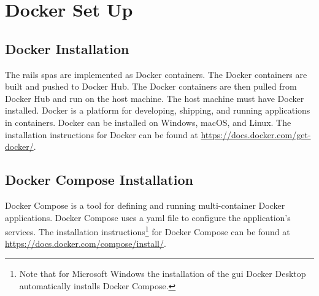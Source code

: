 \chapter{Docker Set Up}
\label{ch:installandrun}
\section{Docker Installation}
\label{sec:dockerinstall}
The \gls{rails} \glspl{spa} are implemented as Docker containers. The Docker containers are built and pushed to Docker Hub. The Docker containers are then pulled from Docker Hub and run on the host machine. 
The host machine must have Docker installed. Docker is a platform for developing, shipping, and running applications in containers. Docker can be installed on Windows, macOS, and Linux. 
The installation instructions for Docker can be found at \href{https://docs.docker.com/get-docker/}{https://docs.docker.com/get-docker/}.
\section{Docker Compose Installation}
\label{sec:dockercomposeinstall}
Docker Compose is a tool for defining and running multi-container Docker applications. Docker Compose uses a \gls{yaml} file to configure the application's services. The installation instructions\footnote{Note that for Microsoft Windows the installation of the \gls{gui} Docker Desktop automatically installs Docker Compose.} for Docker Compose can be found at \href{https://docs.docker.com/compose/install/}{https://docs.docker.com/compose/install/}.
